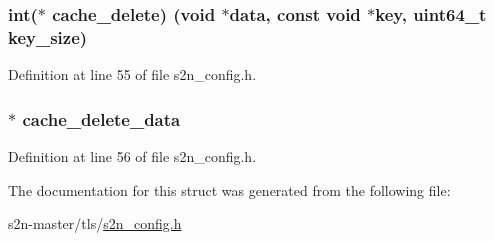 \subsubsection[{\texorpdfstring{cache\+\_\+delete}{cache_delete}}]{\setlength{\rightskip}{0pt plus 5cm}int($\ast$ cache\+\_\+delete) ({\bf void} $\ast$data, const {\bf void} $\ast$key, uint64\+\_\+t key\+\_\+size)}\hypertarget{structs2n__config_aee07b55c829f3dc3917616e17ae65c53}{}\label{structs2n__config_aee07b55c829f3dc3917616e17ae65c53}


Definition at line 55 of file s2n\+\_\+config.\+h.

\subsubsection[{\texorpdfstring{cache\+\_\+delete\+\_\+data}{cache_delete_data}}]{$\ast$ cache\+\_\+delete\+\_\+data}\hypertarget{structs2n__config_ac7bc331ca507124c1ef16e7d2321716b}{}\label{structs2n__config_ac7bc331ca507124c1ef16e7d2321716b}


Definition at line 56 of file s2n\+\_\+config.\+h.



The documentation for this struct was generated from the following file\+:\begin{DoxyCompactItemize}
\item 
s2n-\/master/tls/\hyperlink{s2n__config_8h}{s2n\+\_\+config.\+h}\end{DoxyCompactItemize}
